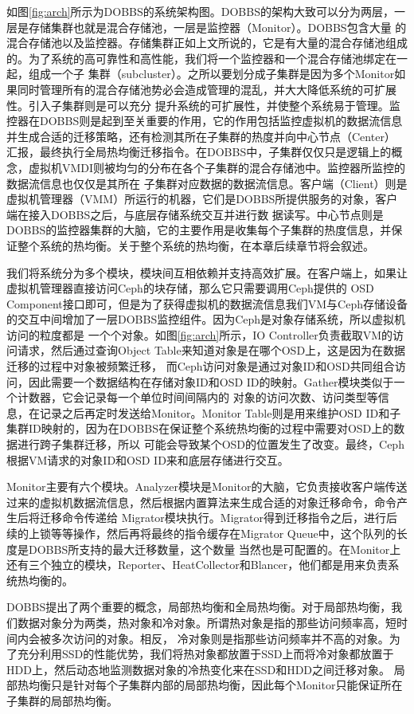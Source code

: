 如图\ref{fig:arch}所示为DOBBS的系统架构图。DOBBS的架构大致可以分为两层，一层是存储集群也就是混合存储池，一层是监控器（Monitor）。DOBBS包含大量
的混合存储池以及监控器。存储集群正如上文所说的，它是有大量的混合存储池组成的。为了系统的高可靠性和高性能，我们将一个监控器和一个混合存储池绑定在一起，组成一个子
集群（subcluster）。之所以要划分成子集群是因为多个Monitor如果同时管理所有的混合存储池势必会造成管理的混乱，并大大降低系统的可扩展性。引入子集群则是可以充分
提升系统的可扩展性，并使整个系统易于管理。监控器在DOBBS则是起到至关重要的作用，它的作用包括监控虚拟机的数据流信息并生成合适的迁移策略，还有检测其所在子集群的热度并向中心节点（Center）
汇报，最终执行全局热均衡迁移指令。在DOBBS中，子集群仅仅只是逻辑上的概念，虚拟机VMDI则被均匀的分布在各个子集群的混合存储池中。监控器所监控的数据流信息也仅仅是其所在
子集群对应数据的数据流信息。客户端（Client）则是虚拟机管理器（VMM）所运行的机器，它们是DOBBS所提供服务的对象，客户端在接入DOBBS之后，与底层存储系统交互并进行数
据读写。中心节点则是DOBBS的监控器集群的大脑，它的主要作用是收集每个子集群的热度信息，并保证整个系统的热均衡。关于整个系统的热均衡，在本章后续章节将会叙述。

我们将系统分为多个模块，模块间互相依赖并支持高效扩展。在客户端上，如果让虚拟机管理器直接访问Ceph的块存储，那么它只需要调用Ceph提供的
OSD Component接口即可，但是为了获得虚拟机的数据流信息我们VM与Ceph存储设备的交互中间增加了一层DOBBS监控组件。因为Ceph是对象存储系统，所以虚拟机访问的粒度都是
一个个对象。如图\ref{fig:arch}所示，IO Controller负责截取VM的访问请求，然后通过查询Object Table来知道对象是在哪个OSD上，这是因为在数据迁移的过程中对象被频繁迁移，
而Ceph访问对象是通过对象ID和OSD共同组合访问，因此需要一个数据结构在存储对象ID和OSD ID的映射。Gather模块类似于一个计数器，它会记录每一个单位时间间隔内的
对象的访问次数、访问类型等信息，在记录之后再定时发送给Monitor。Monitor Table则是用来维护OSD ID和子集群ID映射的，因为在DOBBS在保证整个系统热均衡的过程中需要对OSD上的数据进行跨子集群迁移，所以
可能会导致某个OSD的位置发生了改变。最终，Ceph根据VM请求的对象ID和OSD ID来和底层存储进行交互。

Monitor主要有六个模块。Analyzer模块是Monitor的大脑，它负责接收客户端传送过来的虚拟机数据流信息，然后根据内置算法来生成合适的对象迁移命令，命令产生后将迁移命令传递给
Migrator模块执行。Migrator得到迁移指令之后，进行后续的上锁等等操作，然后再将最终的指令缓存在Migrator Queue中，这个队列的长度是DOBBS所支持的最大迁移数量，这个数量
当然也是可配置的。在Monitor上还有三个独立的模块，Reporter、HeatCollector和Blancer，他们都是用来负责系统热均衡的。

DOBBS提出了两个重要的概念，局部热均衡和全局热均衡。对于局部热均衡，我们数据对象分为两类，热对象和冷对象。所谓热对象是指的那些访问频率高，短时间内会被多次访问的对象。相反，
冷对象则是指那些访问频率并不高的对象。为了充分利用SSD的性能优势，我们将热对象都放置于SSD上而将冷对象都放置于HDD上，然后动态地监测数据对象的冷热变化来在SSD和HDD之间迁移对象。
局部热均衡只是针对每个子集群内部的局部热均衡，因此每个Monitor只能保证所在子集群的局部热均衡。

